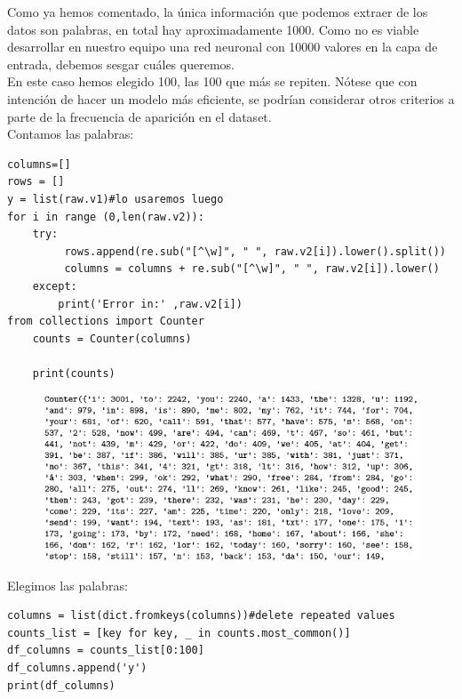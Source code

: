 \documentclass[a4paper,10pt]{article}
\begin{document}
Como ya hemos comentado, la única información que podemos extraer de los datos son palabras, en total hay aproximadamente 1000. Como no es viable desarrollar en nuestro equipo una red neuronal con 10000 valores en la capa de entrada, debemos sesgar cuáles queremos.\\ En este caso hemos elegido 100, las 100 que más se repiten. Nótese que con intención de hacer un modelo más eficiente, se podrían considerar otros criterios a parte de la frecuencia de aparición en el dataset.\\
Contamos las palabras:
\begin{lstlisting}
columns=[] 
rows = [] 
y = list(raw.v1)#lo usaremos luego 
for i in range (0,len(raw.v2)): 
    try:
         rows.append(re.sub("[^\w]", " ", raw.v2[i]).lower().split()) 
         columns = columns + re.sub("[^\w]", " ", raw.v2[i]).lower()
    except: 
        print('Error in:' ,raw.v2[i])
from collections import Counter 
    counts = Counter(columns)

    print(counts)
\end{lstlisting}
\begin{figure}[H]
\centering
\includegraphics[scale=0.83]{Annotation 2020-03-23 182424.png}
\end{figure}
Elegimos las palabras:
\begin{lstlisting}
columns = list(dict.fromkeys(columns))#delete repeated values 
counts_list = [key for key, _ in counts.most_common()] 
df_columns = counts_list[0:100] 
df_columns.append('y') 
print(df_columns)
\end{lstlisting}
\end{document}
